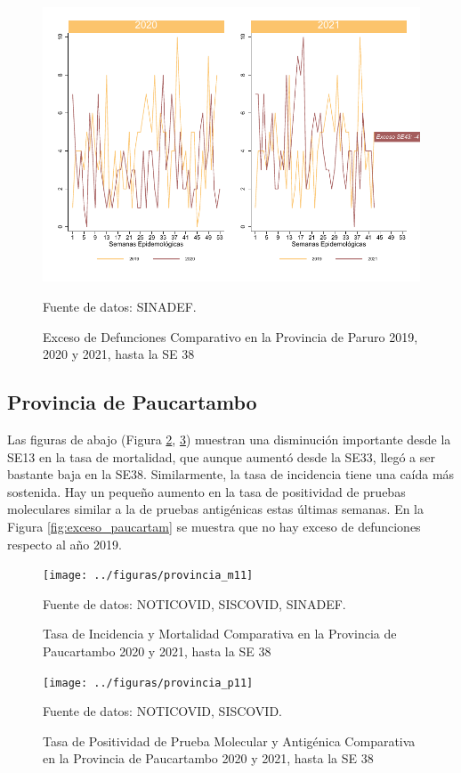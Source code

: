 \documentclass[12pt,a4paper,openany]{book}
\begin{document}
	\begin{figure}[h]
	\caption{Exceso de Defunciones Comparativo en la Provincia de Paruro 2019, 2020 y 2021, hasta la SE 38}\label{fig:exceso_paruro}
	\begin{center}
		\includegraphics[width=0.7\linewidth]{../figuras/exceso_10}
	\end{center}
	{\footnotesize {Fuente de datos: SINADEF.}}
	\end{figure}


\clearpage

	\subsection*{Provincia de Paucartambo}
	\noindent Las figuras de abajo (Figura \ref{fig:inc_mort_paucartam}, \ref{fig:positividad_paucartam})  muestran una disminución importante desde la SE13 en la tasa de mortalidad, que aunque aumentó desde la SE33, llegó a ser bastante baja en la SE38. Similarmente, la tasa de incidencia tiene una caída más sostenida. Hay un pequeño aumento en la tasa de positividad de pruebas moleculares similar a la de pruebas antigénicas estas últimas semanas. En la Figura \ref{fig:exceso_paucartam} se muestra que no hay exceso de defunciones respecto al año 2019.

	\begin{figure}[h]
	\caption{Tasa de Incidencia y Mortalidad Comparativa en la Provincia de Paucartambo 2020 y 2021, hasta la SE 38}\label{fig:inc_mort_paucartam}
	\begin{center}
		\texttt{[image: ../figuras/provincia\_m11]}
	\end{center}
	{\footnotesize {Fuente de datos: NOTICOVID, SISCOVID, SINADEF.}}
	\end{figure}

	\begin{figure}[h]
	\caption{Tasa de Positividad de Prueba Molecular y Antigénica Comparativa en la Provincia de Paucartambo 2020 y 2021, hasta la SE 38}\label{fig:positividad_paucartam}
	\begin{center}
		\texttt{[image: ../figuras/provincia\_p11]}
	\end{center}
	{\footnotesize {Fuente de datos: NOTICOVID, SISCOVID.}}
	\end{figure}
\end{document}
